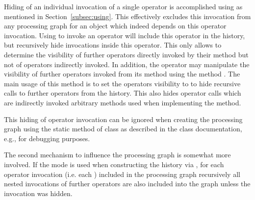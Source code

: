 Hiding of an individual invocation of a single operator is accomplished using
 as mentioned in Section~\ref{subsec:using}.
This effectively excludes this invocation from any processing graph
for an object which indeed depends on this operator invocation.
Using   to invoke an operator will
include this operator in the history, but recursively hide invocations inside
this operator.
This only allows to determine the visibility of further operators directly
invoked by their  method but not of operators indirectly invoked.
In addition, the operator may manipulate the visibility of further operators invoked
from its  method
using the method .
The main usage of this method is to set the operators visibility to 
to hide recursive calls to further operators from the history.
This also hides operator calls which are indirectly invoked arbitrary methods used when implementing
the  method.

This hiding of operator invocation can be ignored when creating the processing graph
using the static method  of
class  as described in the class documentation,
e.g., for debugging purposes.

The second mechanism to influence the processing graph is somewhat more involved.
If the mode  is used when constructing
the history via ,
for each operator invocation (i.e. each ) included in the
processing graph recursively all nested invocations of further operators are also
included into the graph unless the invocation was hidden.

